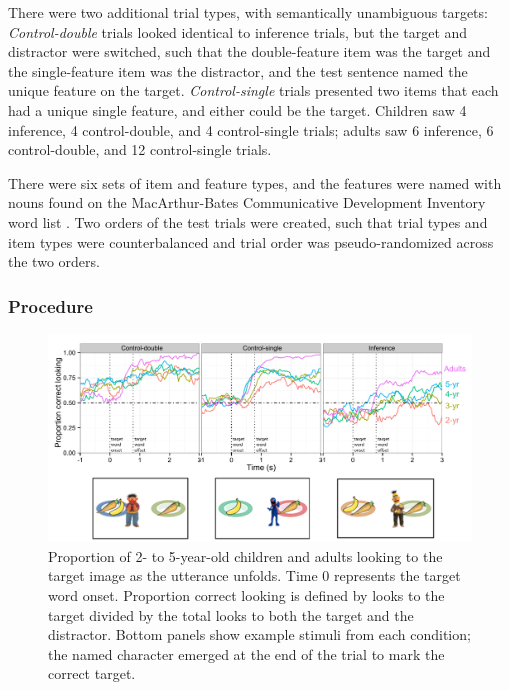 \documentclass[10pt,letterpaper]{article}
\begin{document}
There were two additional trial types, with semantically unambiguous targets: \emph{Control-double} trials looked identical to inference trials, but the target and distractor were switched, such that the double-feature item was the target and the single-feature item was the distractor, and the test sentence named the unique feature on the target. \emph{Control-single} trials presented two items that each had a unique single feature, and either could be the target. Children saw 4 inference, 4 control-double, and 4 control-single trials; adults saw 6 inference, 6 control-double, and 12 control-single trials. 

There were six sets of item and feature types, and the features were named with nouns found on the  MacArthur-Bates Communicative Development Inventory word list \cite{fenson1994variability}. Two orders of the test trials were created, such that trial types and item types were counterbalanced and trial order was pseudo-randomized across the two orders.

\subsubsection{Procedure}


\begin{figure}[t]
\begin{center} 
  \includegraphics[width=.9\textwidth]{figures/expt1-accuracy.pdf}
  \caption{\label{fig:age} Proportion of 2- to 5-year-old children and adults looking to the target image as the utterance unfolds. Time 0 represents the target word onset. Proportion correct looking is defined by looks to the target divided by the total looks to both the target and the distractor. Bottom panels show example stimuli from each condition; the named character emerged at the end of the trial to mark the correct target.}
  \end{center} 
\end{figure}
\end{document}
